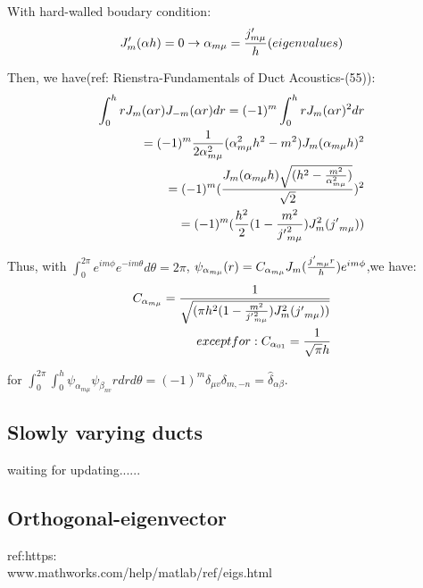 \documentclass{Note}
\begin{document}
With hard-walled boudary condition:
\begin{equation}
\begin{aligned}
J_m'(\alpha h)=0 \rightarrow \alpha_{m\mu}={{j'_{m\mu}}\over h} (eigenvalues)
\end{aligned}
\end{equation}

Then, we have(ref: Rienstra-Fundamentals of Duct Acoustics-(55)):
\begin{equation}
\begin{aligned}
\int_0^h  r J_m(\alpha r)  J_{-m}(\alpha r)dr=(-1)^m\int_0^h  r J_m(\alpha r)^2 dr\\
=(-1)^m 
{1\over 2\alpha_{m\mu}^2}(\alpha_{m\mu}^2h^2-m^2)J_m(\alpha_{m\mu} h)^2\\
=(-1)^m 
({J_m(\alpha_{m\mu} h)\sqrt{(h^2-{m^2\over \alpha_{m\mu}^2} )}\over \sqrt{2}})^2\\
=(-1)^m 
({{h^2\over 2}(1-{m^2\over {j'}_{m\mu}^2} )}J^2_m({j'}_{m\mu}))\\
\end{aligned}
\end{equation}

Thus, with $\int_0^{2\pi} e^{im\phi}e^{-im\theta}  d\theta=2\pi$,
$\psi_{\alpha_{m\mu}}(r)=C_{\alpha_{m\mu}}J_m({{j'}_{m\mu} r\over h})e^{im\phi}$,we have:
\begin{equation}
\begin{aligned}
C_{\alpha_{m\mu}}={1\over \sqrt{({{\pi h^2}(1-{m^2\over {j'}_{m\mu}^2} )}J^2_m({j'}_{m\mu}))}}\\
except for:
C_{\alpha_{01}}={1 \over \sqrt{\pi}h}
\end{aligned}
\end{equation}

for 
 $\int_0^{2\pi}\int_0^h \psi_{\alpha_{m\mu}} \psi_{\beta_{nv}} r dr d\theta=(-1)^m\delta_{\mu v} \delta_{m,-n} =\widehat{\delta }_{\alpha\beta}$.


\subsection{Slowly varying ducts}

waiting for updating......

\subsection{Orthogonal-eigenvector}
 ref:https:\\www.mathworks.com/help/matlab/ref/eigs.html
 
\end{document}
